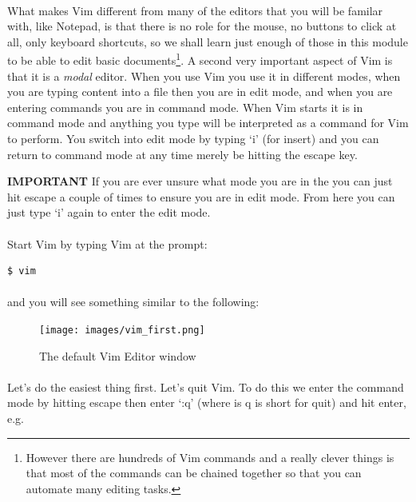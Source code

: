 \documentclass[12pt, a4paper, oneside]{book}
\begin{document}
\paragraph{} What makes Vim different from many of the editors that you will be familar with, like Notepad, is that there is no role for the mouse, no buttons to click at all, only keyboard shortcuts, so we shall learn just enough of those in this module to be able to edit basic documents\footnote{However there are hundreds of Vim commands and a really clever things is that most of the commands can be chained together so that you can automate many editing tasks.}. A second very important aspect of Vim is that it is a \emph{modal} editor. When you use Vim you use it in different modes, when you are typing content into a file then you are in edit mode, and when you are entering commands you are in command mode. When Vim starts it is in command mode and anything you type will be interpreted as a command for Vim to perform. You switch into edit mode by typing `i' (for insert) and you can return to command mode at any time merely be hitting the escape key.

\begin{framed}
\textbf{IMPORTANT} If you are ever unsure what mode you are in the you can just hit escape a couple of times to ensure you are in edit mode. From here you can just type `i' again to enter the edit mode.
\end{framed}

\paragraph{} Start Vim by typing Vim at the prompt:
\begin{lstlisting}[style=DOS]
    $ vim
\end{lstlisting}
\paragraph{} and you will see something similar to the following:

\begin{figure}[H]
\centering
\texttt{[image: images/vim\_first.png]}
\caption{The default Vim Editor window}
\label{fig:vim-first}
\end{figure}

\paragraph{} Let's do the easiest thing first. Let's quit Vim. To do this we enter the command mode by hitting escape then enter `:q' (where is q is short for quit) and hit enter, e.g.
\end{document}
